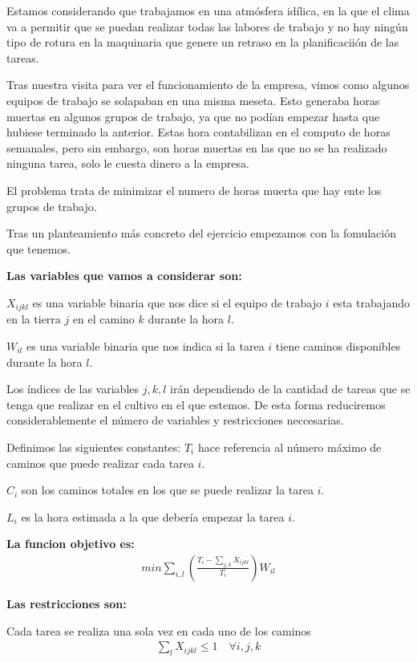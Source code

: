 Estamos considerando que trabajamos en una atmósfera idílica, en la que el clima va a permitir que se puedan realizar todas las labores
de trabajo y no hay ningún tipo de rotura en la maquinaria que genere un retraso en la planificaciión de las tareas.

Tras nuestra visita para ver el funcionamiento de la empresa, vimos como algunos equipos de trabajo se solapaban en una misma 
meseta. Esto generaba horas muertas en algunos grupos de trabajo, ya que no podían empezar hasta que hubiese terminado la anterior. 
Estas hora contabilizan en el computo de horas semanales, pero sin embargo, son horas muertas en las que no se ha realizado ninguna tarea,
solo le cuesta dinero a la empresa. 

El problema trata de minimizar el numero de horas muerta que hay ente los grupos de trabajo. 

Tras un planteamiento más concreto del ejercicio empezamos con la fomulación que tenemos. 

\textbf{Las variables que vamos a considerar son:} 

$X_{ijkl}$ es una variable binaria que nos dice si el equipo de trabajo $i$ esta trabajando en la tierra $j$ en el camino $k$ durante 
la hora $l$.

$W_{il}$ es una variable binaria que nos indica si la tarea $i$ tiene caminos disponibles durante la hora $l$. 

Los índices de las variables $j,k,l$ irán dependiendo de la cantidad de tareas que se tenga que realizar en el cultivo en el que estemos. 
De esta forma reduciremos considerablemente el número de variables y restricciones neccesarias.

Definimos las siguientes constantes: 
$T_i$ hace referencia al número máximo de caminos que puede realizar cada tarea $i$. 

$C_i$ son los caminos totales en los que se puede realizar la tarea $i$. 

$L_i$ es la hora estimada a la que debería empezar la tarea $i$. 

\textbf{La funcion objetivo es:}
\[\begin{aligned}
    min \sum_{i,l}\left( \frac{T_i-\sum_{j,k} X_{ijkl}}{T_i}\right)W_{il}
\end{aligned}\]

\textbf{Las restricciones son:}

Cada tarea se realiza una sola vez en cada uno de los caminos 
\[\begin{aligned}
\sum_{l} X_{ijkl} \leq 1 \quad \forall i,j,k
\end{aligned}\]

